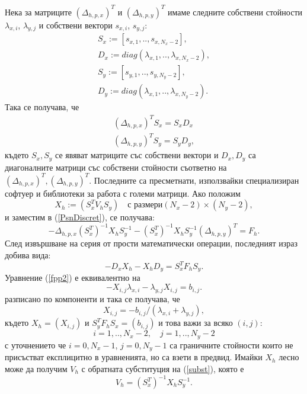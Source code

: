 \documentclass[a5paper]{article}
\newcommand{\be}{\begin{equation}}
\newcommand{\ee}{\end{equation}}
\newcommand{\rf}[1]{(\ref{#1})}
\theoremstyle{remark}
\begin{document}
\begin{normalsize}
\iffalse
Нека за матриците $(\Delta_{h,p,x})^T$ и $(\Delta_{h,p,y})^T$ имаме следните собствени стойности $\lambda_{x,i}$, $\lambda_{y,j}$ и собствени вектори $s_{x,i}$, $s_{y,j}$:
\begin{align}
S_x:=[s_{x,1},..,s_{x,N_x-2}],\\
D_x:= diag(\lambda_{x,1},..,\lambda_{x,N_x-2}),\\
S_y:=[s_{y,1},..,s_{y,N_y-2}],\\
D_y:= diag(\lambda_{x,1},..,\lambda_{x,N_y-2}).
\end{align}
Така се получава, че
\begin{align}\label{eigIdentity}
(\Delta_{h,p,x})^T  S_x = S_x  D_x\nonumber\\
(\Delta_{h,p,y})^T   S_y = S_y  D_y,
\end{align}
където $S_x, S_y$ се явяват матриците със собствени вектори и $D_x, D_y$ са диагоналните матрици със собствени стойности съответно на $(\Delta_{h,p,x})^T, (\Delta_{h,p,y})^T$. Последните са пресметнати, използвайки специализиран софтуер и библиотеки за работа с големи матрици. Ако положим
\be\label{subst}
X_h := ( S_x^T  V_h  S_y ) \quad \text{с размери} (N_x-2)\times(N_y-2),
\ee
и заместим в \rf{PsnDiscret}, се получава:
\be
-\Delta_{h,p,x}  (S_x^T)^{-1} X_h  S_y^{-1}  -(S_x^T)^{-1} X_h  S_y^{-1}  (\Delta_{h,p,y})^T = F_h.
\ee
След извършване на серия от прости математически операции, последният израз добива вида:
\be\label{fpp2}
- D_x  X_h -X_h  D_y = S_x^T  F_h  S_y.
\ee
Уравнение \rf{fpp2} е еквивалентно на
\be\label{fpp3}
-X_{i,j} \lambda_{x,i} - \lambda_{y,j} X_{i,j} = b_{i,j}.
\ee
разписано по компоненти и така се получава, че
\be\label{fpp4}
X_{i,j} = - b_{i,j}/(\lambda_{x,i} + \lambda_{y,j} ),
\ee
където $X_h = (X_{i,j})$ и $S_y^T  F_h   S_x = (b_{i,j})$ и това важи за всяко $(i,j)$:
$$i = 1,..,N_x-2, \quad j = 1,..,N_y-2 $$
с уточнението че $i = 0,N_x-1$, $j = 0,N_y-1$ са граничните стойности които не присъстват експлицитно в уравненията, но са взети в предвид. Имайки $X_h$ лесно може да получим $V_h$  с обратната субституция на \rf{subst}, която е 
\be\label{substInv}
V_h = (S_x^T)^{-1}  X_h  S_y^{-1}.
\ee


\end{normalsize}
\end{document}
